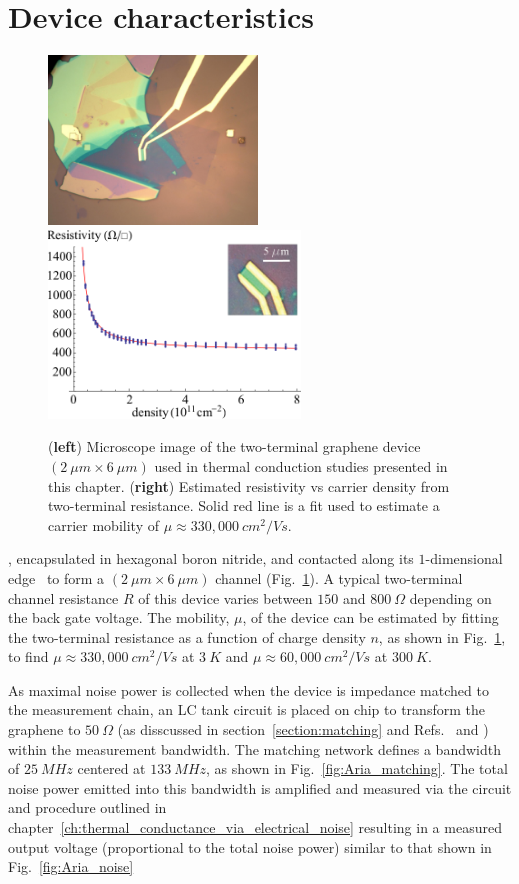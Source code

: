 \section{Device characteristics}
\begin{figure}
\centering
\includegraphics[height=45mm, valign=t]{figures/high_density_graphene/picture_aria.jpg}
\includegraphics[height=50mm, valign=t]{figures/high_density_graphene/mobility.png}
\caption{(\textbf{left}) Microscope image of the two-terminal graphene device $(2~\mu m\times6~\mu m)$ used in thermal conduction studies presented in this chapter. (\textbf{right}) Estimated resistivity vs carrier density from two-terminal resistance. Solid red line is a fit used to estimate a carrier mobility of $\mu\approx 330,000~cm^2/Vs$.}
\label{fig:Aria}
\end{figure}
, encapsulated in hexagonal boron nitride, and contacted along its $1$-dimensional edge~\cite{wang_one-dimensional_2013} to form a $(2~\mu m\times6~\mu m)$ channel (Fig.~\ref{fig:Aria}). A typical two-terminal channel resistance $R$ of this device varies between $150$ and $800~\Omega$ depending on the back gate voltage. The mobility, $\mu$, of the device can be estimated by fitting the two-terminal resistance as a function of charge density $n$, as shown in Fig.~\ref{fig:Aria}, to find $\mu\approx 330,000~cm^2/Vs$ at $3~K$ and $\mu\approx 60,000~cm^2/Vs$ at $300~K$.

As maximal noise power is collected when the device is impedance matched to the measurement chain, an LC tank circuit is placed on chip to transform the graphene to $50~\Omega$ (as disscussed in section~\ref{section:matching} and Refs.~\cite{fong_ultrasensitive_2012} and  \cite{schoelkopf_radio-frequency_1998}) within the measurement bandwidth. The matching network defines a bandwidth of ${25~MHz}$ centered at ${133~MHz}$, as shown in Fig.~\ref{fig:Aria_matching}. The total noise power emitted into this bandwidth is amplified and measured via the circuit and procedure outlined in chapter~\ref{ch:thermal_conductance_via_electrical_noise} resulting in a measured output voltage (proportional to the total noise power) similar to that shown in Fig.~\ref{fig:Aria_noise}

